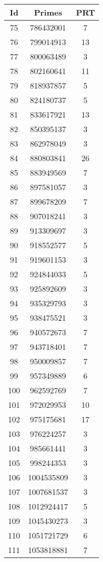 \begin{spacing}{0.8}
\begin{tabular}{ccc}
\toprule
       Id & Primes & PRT\\
 \midrule
 75 & 786432001 & 7\\
 76 & 799014913 & 13\\
 77 & 800063489 & 3\\
 78 & 802160641 & 11\\
 79 & 818937857 & 5\\
 80 & 824180737 & 5\\
 81 & 833617921 & 13\\
 82 & 850395137 & 3\\
 83 & 862978049 & 3\\
 84 & 880803841 & 26\\
 85 & 883949569 & 7\\
 86 & 897581057 & 3\\
 87 & 899678209 & 7\\
 88 & 907018241 & 3\\
 89 & 913309697 & 3\\
 90 & 918552577 & 5\\
 91 & 919601153 & 3\\
 92 & 924844033 & 5\\
 93 & 925892609 & 3\\
 94 & 935329793 & 3\\
 95 & 938475521 & 3\\
 96 & 940572673 & 7\\
 97 & 943718401 & 7\\
 98 & 950009857 & 7\\
 99 & 957349889 & 6\\
 100 & 962592769 & 7\\
 101 & 972029953 & 10\\
 102 & 975175681 & 17\\
 103 & 976224257 & 3\\
 104 & 985661441 & 3\\
 105 & 998244353 & 3\\
 106 & 1004535809 & 3\\
 107 & 1007681537 & 3\\
 108 & 1012924417 & 5\\
 109 & 1045430273 & 3\\
 110 & 1051721729 & 6\\
 111 & 1053818881 & 7\\
\bottomrule
\end{tabular}
\end{spacing}
